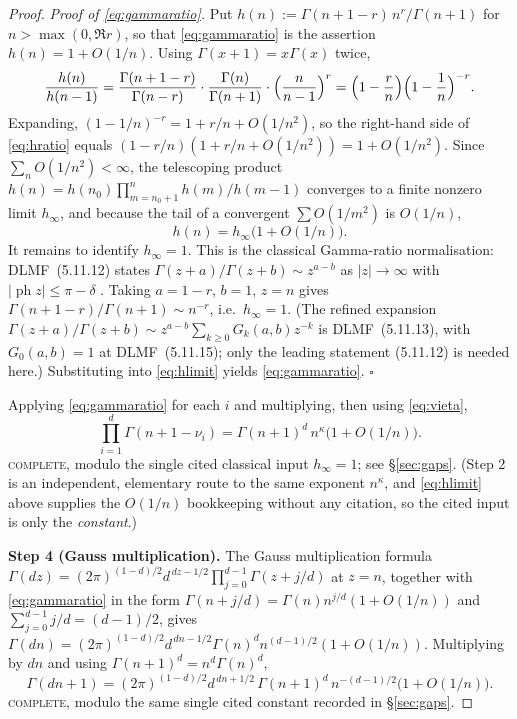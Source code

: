 \documentclass[11pt]{article}
\theoremstyle{definition}
\begin{document}
\begin{proof}
\emph{Proof of \eqref{eq:gammaratio}.} Put
$h(n):=\Gamma(n+1-r)\,n^{r}/\Gamma(n+1)$ for $n>\max(0,\Re r)$, so that
\eqref{eq:gammaratio} is the assertion $h(n)=1+O(1/n)$. Using
$\Gamma(x+1)=x\Gamma(x)$ twice,
\begin{equation}\label{eq:hratio}
\frac{h(n)}{h(n-1)}
=\frac{\Gamma(n+1-r)}{\Gamma(n-r)}\cdot\frac{\Gamma(n)}{\Gamma(n+1)}
\cdot\Bigl(\frac{n}{n-1}\Bigr)^{r}
=\Bigl(1-\frac{r}{n}\Bigr)\Bigl(1-\frac1n\Bigr)^{-r} .
\end{equation}
Expanding, $(1-1/n)^{-r}=1+r/n+O(1/n^{2})$, so the right-hand side of
\eqref{eq:hratio} equals $(1-r/n)(1+r/n+O(1/n^2))=1+O(1/n^{2})$. Since
$\sum_n O(1/n^2)<\infty$, the telescoping product
$h(n)=h(n_0)\prod_{m=n_0+1}^{n}h(m)/h(m-1)$ converges to a finite nonzero limit
$h_\infty$, and because the tail of a convergent $\sum O(1/m^{2})$ is $O(1/n)$,
\begin{equation}\label{eq:hlimit}
h(n)=h_\infty\bigl(1+O(1/n)\bigr).
\end{equation}
It remains to identify $h_\infty=1$. This is the classical Gamma-ratio
normalisation: DLMF~(5.11.12) states
$\Gamma(z+a)/\Gamma(z+b)\sim z^{a-b}$ as
$|z|\to\infty$ with $|\operatorname{ph}z|\le\pi-\delta$
\cite[\S5.11(iii)]{DLMF}. Taking $a=1-r$, $b=1$, $z=n$ gives
$\Gamma(n+1-r)/\Gamma(n+1)\sim n^{-r}$, i.e.\ $h_\infty=1$. (The refined
expansion $\Gamma(z+a)/\Gamma(z+b)\sim z^{a-b}\sum_{k\ge0}G_k(a,b)z^{-k}$ is
DLMF~(5.11.13), with $G_0(a,b)=1$ at DLMF~(5.11.15); only the leading statement
(5.11.12) is needed here.) Substituting into
\eqref{eq:hlimit} yields \eqref{eq:gammaratio}. \hfill$\square$

Applying \eqref{eq:gammaratio} for each $i$ and multiplying, then using
\eqref{eq:vieta},
\begin{equation}\label{eq:prodgamma}
\prod_{i=1}^{d}\Gamma(n+1-\nu_i)=\Gamma(n+1)^{d}\,n^{\kappa}\bigl(1+O(1/n)\bigr).
\end{equation}
\textsc{complete}, modulo the single cited classical input $h_\infty=1$; see
\S\ref{sec:gaps}. (Step 2 is an independent, elementary route to the same
exponent $n^{\kappa}$, and \eqref{eq:hlimit} above supplies the $O(1/n)$
bookkeeping without any citation, so the cited input is only the
\emph{constant}.)

\medskip\noindent\textbf{Step 4 (Gauss multiplication).}
The Gauss multiplication formula
$\Gamma(dz)=(2\pi)^{(1-d)/2}d^{\,dz-1/2}\prod_{j=0}^{d-1}\Gamma(z+j/d)$ at
$z=n$, together with \eqref{eq:gammaratio} in the form
$\Gamma(n+j/d)=\Gamma(n)n^{j/d}(1+O(1/n))$ and
$\sum_{j=0}^{d-1}j/d=(d-1)/2$, gives
$\Gamma(dn)=(2\pi)^{(1-d)/2}d^{\,dn-1/2}\Gamma(n)^{d}n^{(d-1)/2}(1+O(1/n))$.
Multiplying by $dn$ and using $\Gamma(n+1)^d=n^d\Gamma(n)^d$,
\begin{equation}\label{eq:gauss}
\Gamma(dn+1)=(2\pi)^{(1-d)/2}d^{\,dn+1/2}\,\Gamma(n+1)^{d}\,n^{-(d-1)/2}
\bigl(1+O(1/n)\bigr).
\end{equation}
\textsc{complete}, modulo the same single cited constant recorded in
\S\ref{sec:gaps}.


\end{proof}
\end{document}
